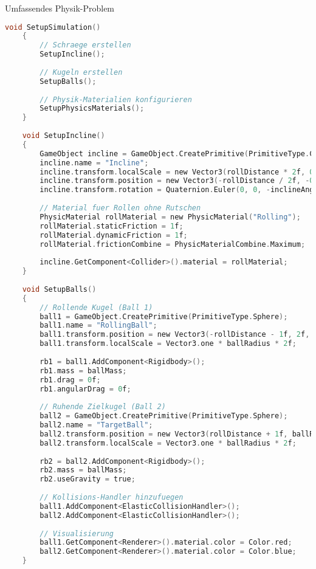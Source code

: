 \begin{example2}{Umfassendes Physik-Problem}
\begin{lstlisting}[language=C, style=basesmol]
    void SetupSimulation() 
    {
        // Schraege erstellen
        SetupIncline();
        
        // Kugeln erstellen
        SetupBalls();
        
        // Physik-Materialien konfigurieren
        SetupPhysicsMaterials();
    }
    
    void SetupIncline() 
    {
        GameObject incline = GameObject.CreatePrimitive(PrimitiveType.Cube);
        incline.name = "Incline";
        incline.transform.localScale = new Vector3(rollDistance * 2f, 0.1f, 1f);
        incline.transform.position = new Vector3(-rollDistance / 2f, -0.5f, 0);
        incline.transform.rotation = Quaternion.Euler(0, 0, -inclineAngle);
        
        // Material fuer Rollen ohne Rutschen
        PhysicMaterial rollMaterial = new PhysicMaterial("Rolling");
        rollMaterial.staticFriction = 1f;
        rollMaterial.dynamicFriction = 1f;
        rollMaterial.frictionCombine = PhysicMaterialCombine.Maximum;
        
        incline.GetComponent<Collider>().material = rollMaterial;
    }
    
    void SetupBalls() 
    {
        // Rollende Kugel (Ball 1)
        ball1 = GameObject.CreatePrimitive(PrimitiveType.Sphere);
        ball1.name = "RollingBall";
        ball1.transform.position = new Vector3(-rollDistance - 1f, 2f, 0);
        ball1.transform.localScale = Vector3.one * ballRadius * 2f;
        
        rb1 = ball1.AddComponent<Rigidbody>();
        rb1.mass = ballMass;
        rb1.drag = 0f;
        rb1.angularDrag = 0f;
        
        // Ruhende Zielkugel (Ball 2)
        ball2 = GameObject.CreatePrimitive(PrimitiveType.Sphere);
        ball2.name = "TargetBall";
        ball2.transform.position = new Vector3(rollDistance + 1f, ballRadius, 0);
        ball2.transform.localScale = Vector3.one * ballRadius * 2f;
        
        rb2 = ball2.AddComponent<Rigidbody>();
        rb2.mass = ballMass;
        rb2.useGravity = true;
        
        // Kollisions-Handler hinzufuegen
        ball1.AddComponent<ElasticCollisionHandler>();
        ball2.AddComponent<ElasticCollisionHandler>();
        
        // Visualisierung
        ball1.GetComponent<Renderer>().material.color = Color.red;
        ball2.GetComponent<Renderer>().material.color = Color.blue;
    }
    

\end{lstlisting}
\end{example2}
